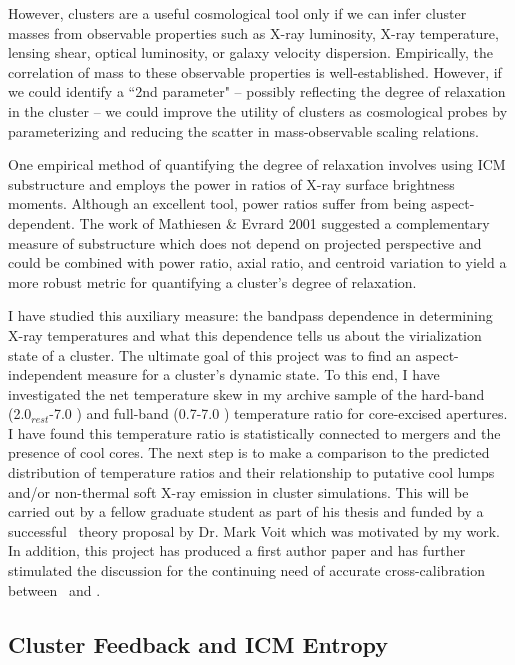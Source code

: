 \documentclass[11pt]{article}
\begin{document}
However, clusters are a useful cosmological tool only if we can infer
cluster masses from observable properties such as X-ray luminosity,
X-ray temperature, lensing shear, optical luminosity, or galaxy
velocity dispersion. Empirically, the correlation of mass to these
observable properties is well-established. However, if we could
identify a ``2nd parameter" -- possibly reflecting the degree of
relaxation in the cluster -- we could improve the utility of clusters
as cosmological probes by parameterizing and reducing the scatter in
mass-observable scaling relations.

One empirical method of quantifying the degree of relaxation involves
using ICM substructure and employs the power in ratios of X-ray surface
brightness moments. Although an excellent tool, power ratios suffer
from being aspect-dependent. The work of Mathiesen \& Evrard 2001
suggested a complementary measure of substructure which does not
depend on projected perspective and could be combined with power
ratio, axial ratio, and centroid variation to yield a more robust
metric for quantifying a cluster's degree of relaxation.

I have studied this auxiliary measure: the bandpass dependence in
determining X-ray temperatures and what this dependence tells us about
the virialization state of a cluster. The ultimate goal of this
project was to find an aspect-independent measure for a cluster's
dynamic state. To this end, I have investigated the net temperature
skew in my archive sample of the hard-band (2.0$_{rest}$-7.0 \keV) and
full-band (0.7-7.0 \keV) temperature ratio for core-excised
apertures. I have found this temperature ratio is statistically
connected to mergers and the presence of cool cores. The next step is
to make a comparison to the predicted distribution of temperature
ratios and their relationship to putative cool lumps and/or
non-thermal soft X-ray emission in cluster simulations. This will be
carried out by a fellow graduate student as part of his thesis and
funded by a successful \Chandra\ theory proposal by Dr. Mark
Voit which was motivated by my work. In addition, this project has
produced a first author paper and has further stimulated the
discussion for the continuing need of accurate cross-calibration
between \Xmm\ and \Chandra.

\subsection*{Cluster Feedback and ICM Entropy}
\end{document}
